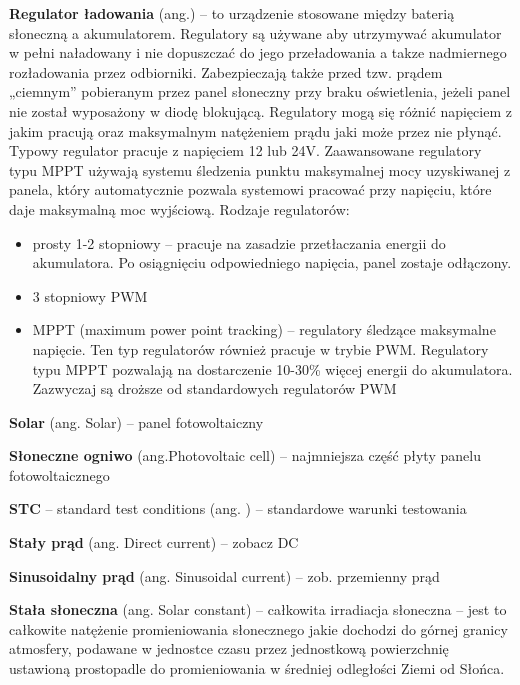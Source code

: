\documentclass[12pt,a4paper]{article}
\begin{document}
\textbf{Regulator ładowania} (ang.) – to urządzenie stosowane między baterią słoneczną a akumulatorem. Regulatory są używane aby utrzymywać akumulator w pełni naładowany i nie dopuszczać do jego przeładowania a takze nadmiernego rozładowania przez odbiorniki. Zabezpieczają także przed tzw. prądem „ciemnym” pobieranym przez panel słoneczny przy braku oświetlenia, jeżeli panel nie został wyposażony w diodę blokującą. Regulatory mogą się różnić napięciem z jakim pracują oraz maksymalnym natężeniem prądu jaki może przez nie płynąć. Typowy regulator pracuje z napięciem 12 lub 24V. Zaawansowane regulatory typu MPPT używają systemu śledzenia punktu maksymalnej mocy uzyskiwanej z panela, który automatycznie pozwala systemowi pracować przy napięciu, które daje maksymalną moc wyjściową. Rodzaje regulatorów:
\begin{itemize}
\item  prosty 1-2 stopniowy – pracuje na zasadzie przetłaczania energii do akumulatora. Po osiągnięciu odpowiedniego napięcia, panel zostaje odłączony.
\item 3 stopniowy PWM
\item  MPPT (maximum power point tracking) – regulatory śledzące maksymalne napięcie. Ten typ regulatorów również pracuje w trybie PWM. Regulatory typu MPPT pozwalają na dostarczenie 10-30\% więcej energii do akumulatora. Zazwyczaj są droższe od standardowych regulatorów PWM
\end{itemize}

\textbf{Solar} (ang. Solar) – panel fotowoltaiczny

\textbf{Słoneczne ogniwo} (ang.Photovoltaic cell) – najmniejsza część płyty panelu fotowoltaicznego

\textbf{STC} – standard test conditions (ang. ) – standardowe warunki testowania

\textbf{Stały prąd} (ang. Direct current) – zobacz DC

\textbf{Sinusoidalny prąd} (ang. Sinusoidal current) – zob. przemienny prąd

\textbf{Stała słoneczna} (ang. Solar constant) – całkowita irradiacja słoneczna – jest to całkowite natężenie promieniowania słonecznego jakie dochodzi do górnej granicy atmosfery, podawane w jednostce czasu przez jednostkową powierzchnię ustawioną prostopadle do promieniowania w średniej odległości Ziemi od Słońca.
\end{document}
